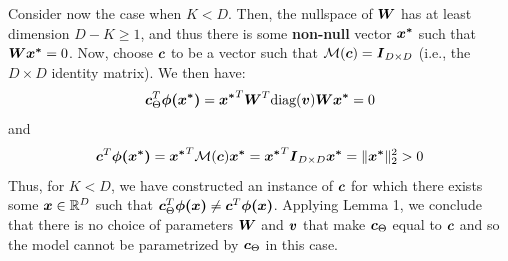 \begin{questions}
        Consider now the case when $K < D$. Then, the nullspace of $\vb*{W}$ has at least dimension $D - K \ge 1$, and thus there is some \textbf{non-null} vector $\vb*{x^*}$ such that $\vb*{Wx^*} = 0$. Now, choose $\vb*{c}$ to be a vector such that $\mathcal{M}(\vb*{c}) = \vb*{I}_{D \times D}$ (i.e., the $D \times D$ identity matrix). We then have:
        \[
            \vb*{c}^T_{\Theta} \vb*{\phi(x^*)}
            = \vb*{x^*}^T \vb*{W}^T \text{diag}(\vb*{v}) \vb*{Wx^*} = 0
        \]
        and
        \[
            \vb*{c}^T \vb*{\phi(x^*)} = \vb*{x^*}^T \mathcal{M}(\vb*{c}) \vb*{x^*} = \vb*{x^*}^T \vb*{I}_{D \times D} \vb*{x^*} = \|\vb*{x^*}\|_2^2 > 0 
        \]
        Thus, for $K < D$, we have constructed an instance of $\vb*{c}$ for which there exists some $\vb*{x} \in \mathbb{R}^{D}$ such that  $\vb*{c}^T_{\Theta} \vb*{\phi(x)} \neq \vb*{c}^T \vb*{\phi(x)}$. Applying Lemma 1, we conclude that there is no choice of parameters $\vb*{W}$ and $\vb*{v}$ that make $\vb*{c}_{\Theta}$ equal to $\vb*{c}$ and so the model cannot be parametrized by $\vb*{c}_{\Theta}$ in this case.


\end{questions}
